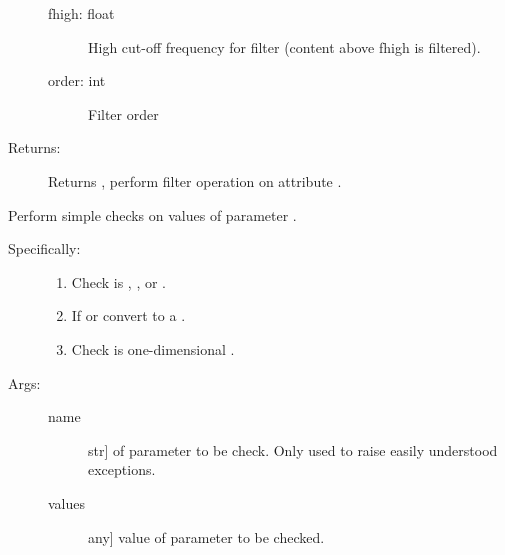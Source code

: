 \documentclass[letterpaper,10pt,english]{sphinxmanual}
\begin{document}
\begin{fulllineitems}
\begin{fulllineitems}
\begin{description}
\begin{description}
\item[{fhigh: float}] \leavevmode
High cut-off frequency for filter (content above fhigh is
filtered).

\item[{order: int}] \leavevmode
Filter order

\end{description}

\item[{Returns:}] \leavevmode
Returns , perform filter operation on attribute .

\end{description}

\end{fulllineitems}


\begin{fulllineitems}
\label{\detokenize{index:sigpropy.TimeSeries.check_input}}
Perform simple checks on values of parameter .
\begin{description}
\item[{Specifically:}] \leavevmode\begin{enumerate}
%
\item {} 
Check  is , , or .

\item {} 
If  or  convert to a .

\item {} 
Check  is one-dimensional .

\end{enumerate}

\item[{Args:}] \leavevmode\begin{description}
\item[{name}] \leavevmode{[}str{]}
 of parameter to be check. Only used to raise 
easily understood exceptions.

\item[{values}] \leavevmode{[}any{]}
value of parameter to be checked.


\end{description}
\end{description}
\end{fulllineitems}
\end{fulllineitems}
\end{document}
